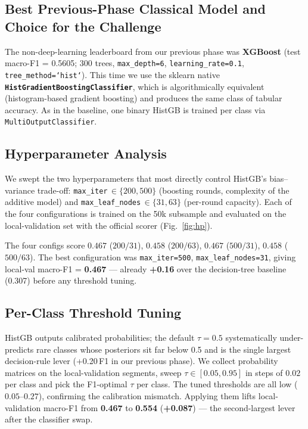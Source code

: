 \documentclass{article}
\begin{document}
\subsection{Best Previous-Phase Classical Model and Choice for the Challenge}
The non-deep-learning leaderboard from our previous phase was
\textbf{XGBoost} (test macro-F1 = 0.5605; 300 trees, \texttt{max\_depth=6},
\texttt{learning\_rate=0.1}, \texttt{tree\_method=`hist`}). This time we use the sklearn native
\textbf{\texttt{HistGradientBoostingClassifier}}, which is algorithmically
equivalent (histogram-based gradient boosting) and produces the same
class of tabular accuracy. As in the baseline, one binary HistGB is
trained per class via \texttt{MultiOutputClassifier}.

\subsection{Hyperparameter Analysis}
We swept the two hyperparameters that most directly control HistGB's
bias--variance trade-off:
\texttt{max\_iter}\,$\in\{200,500\}$ (boosting rounds, complexity of the
additive model) and
\texttt{max\_leaf\_nodes}\,$\in\{31,63\}$ (per-round capacity). Each of
the four configurations is trained on the 50k subsample and evaluated on
the local-validation set with the official scorer (Fig.~\ref{fig:hp}).



The four configs score $0.467$ ($200/31$), $0.458$ ($200/63$), $0.467$ ($500/31$),
$0.458$ ($500/63$). The best configuration was
\texttt{max\_iter=500}, \texttt{max\_leaf\_nodes=31}, giving local-val
macro-F1 = \textbf{0.467} --- already \textbf{+0.16} over the
decision-tree baseline (0.307) before any threshold tuning.

\subsection{Per-Class Threshold Tuning}
HistGB outputs calibrated probabilities; the default $\tau{=}0.5$
systematically under-predicts rare classes whose posteriors sit far
below 0.5 and is the single largest decision-rule lever
(+0.20\,F1 in our previous phase). We collect probability matrices on
the local-validation segments, sweep $\tau\in[0.05, 0.95]$ in steps of
$0.02$ per class and pick the F1-optimal $\tau$ per class. The tuned
thresholds are all low ($0.05$--$0.27$), confirming the calibration
mismatch. Applying them lifts local-validation macro-F1 from
\textbf{0.467} to \textbf{0.554} (\textbf{+0.087}) --- the second-largest
lever after the classifier swap.
\end{document}
